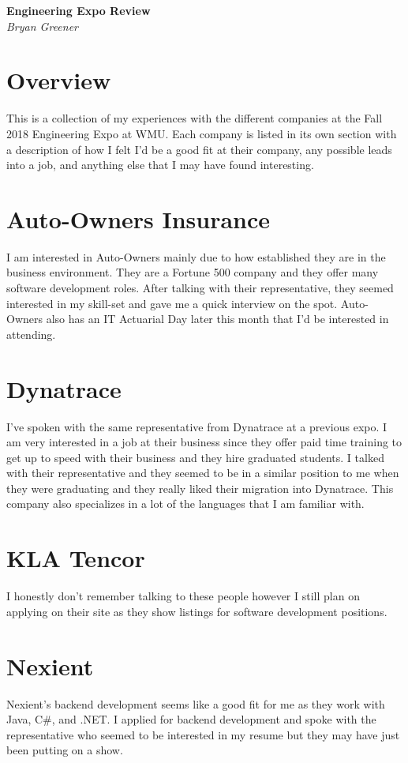 \documentclass{report}
\begin{document}
\begin{center}
	\LARGE\textbf{Engineering Expo Review}\\
	\Large\textit{Bryan Greener}
\end{center}

\section*{Overview}
This is a collection of my experiences with the different companies at the Fall 2018 Engineering Expo at WMU. Each company is listed in its own section with a description of how I felt I'd be a good fit at their company, any possible leads into a job, and anything else that I may have found interesting.

\section*{Auto-Owners Insurance}
I am interested in Auto-Owners mainly due to how established they are in the business environment. They are a Fortune 500 company and they offer many software development roles. After talking with their representative, they seemed interested in my skill-set and gave me a quick interview on the spot. Auto-Owners also has an IT Actuarial Day later this month that I'd be interested in attending.

\section*{Dynatrace}
I've spoken with the same representative from Dynatrace at a previous expo. I am very interested in a job at their business since they offer paid time training to get up to speed with their business and they hire graduated students. I talked with their representative and they seemed to be in a similar position to me when they were graduating and they really liked their migration into Dynatrace. This company also specializes in a lot of the languages that I am familiar with.

\section*{KLA Tencor}
I honestly don't remember talking to these people however I still plan on applying on their site as they show listings for software development positions.

\section*{Nexient}
Nexient's backend development seems like a good fit for me as they work with Java, C\#, and .NET. I applied for backend development and spoke with the representative who seemed to be interested in my resume but they may have just been putting on a show. 
\end{document}
